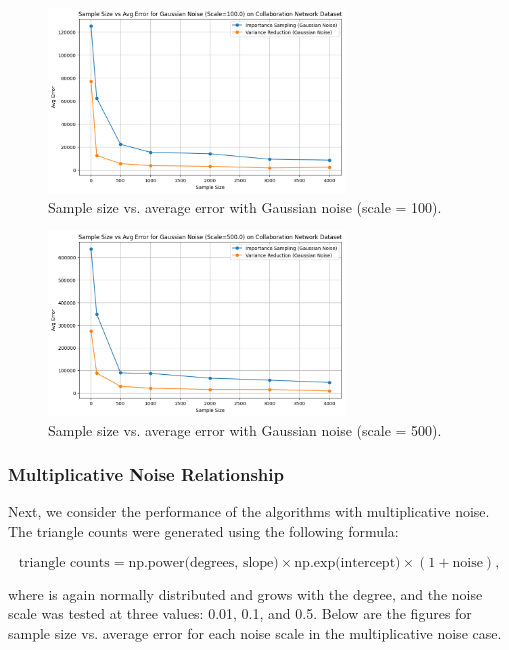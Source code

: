 \documentclass[11pt]{article}
\begin{document}
\begin{figure}[H]
    \centering
    \includegraphics[width=0.7\textwidth]{plots/simulated/percent_error_vs_sample_size_comparison_gaussian_100.0.png}
    \caption{Sample size vs. average error with Gaussian noise (scale = 100).}
    \label{fig:gaussian_noise_100}
\end{figure}

\begin{figure}[H]
    \centering
    \includegraphics[width=0.7\textwidth]{plots/simulated/percent_error_vs_sample_size_comparison_gaussian_500.0.png}
    \caption{Sample size vs. average error with Gaussian noise (scale = 500).}
    \label{fig:gaussian_noise_500}
\end{figure}

\subsubsection{Multiplicative Noise Relationship}

Next, we consider the performance of the algorithms with multiplicative noise. The triangle counts were generated using the following formula:

\[
\text{triangle counts} = \text{np.power(degrees, slope)} \times \text{np.exp(intercept)} \times (1 + \text{noise}),
\]

where  is again normally distributed and grows with the degree, and the noise scale was tested at three values: 0.01, 0.1, and 0.5. Below are the figures for sample size vs. average error for each noise scale in the multiplicative noise case.
\end{document}

